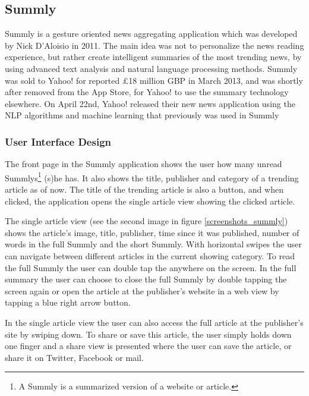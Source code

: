 \subsection{Summly}

Summly is a gesture oriented news aggregating application which was developed by Nick D'Aloisio in 2011. The main idea was not to personalize the news reading experience, but rather create intelligent summaries of the most trending news, by using advanced text analysis and natural language processing methods\cite{summly_idea}. Summly was sold to Yahoo! for reported £18 million GBP in March 2013\cite{summly_sold_yahoo}, and was shortly after removed from the App Store, for Yahoo! to use the summary technology elsewhere\cite{summly_closed}. On April 22nd, Yahoo! released their new news application using the NLP algorithms and machine learning that previously was used in Summly\cite{yahoo_news_app_release}

\subsubsection{User Interface Design}

The front page in the Summly application shows the user how many unread Summlys\footnote{A Summly is a summarized version of a website or article.} (s)he has. It also shows the title, publisher and category of a trending article as of now. The title of the trending article is also a button, and when clicked, the application opens the single article view showing the clicked article. 

The single article view (see the second image in figure \ref{screenshots_summly}) shows the article's image, title, publisher, time since it was published, number of words in the full Summly and the short Summly. With horizontal swipes the user can navigate between different articles in the current showing category. To read the full Summly the user can double tap the anywhere on the screen. In the full summary the user can choose to close the full Summly by double tapping the screen again or open the article at the publisher's website in a web view by tapping a blue right arrow button.

In the single article view the user can also access the full article at the publisher's site by swiping down. To share or save this article, the user simply holds down one finger and a share view is presented where the user can save the article, or share it on Twitter, Facebook or mail.

